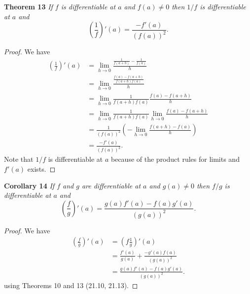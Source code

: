 \documentclass{article}
\begin{document}
\begin{flushleft}
\textbf{Theorem 13}
\textsl{If $f$ is differentiable at $a$ and $f(a) \neq 0$ then $1/f$ is differentiable at $a$ and
\[
\left ( \frac{1}{f} \right )' (a) = \frac{-f'(a)}{(f(a))^2}.
\]}
\begin{proof}
We have
\begin{align*}
\left ( \frac{1}{f} \right )' (a) & = \lim_{h \rightarrow 0} \frac{\frac{1}{f(a+h)} - \frac{1}{f(a)}}{h} \\
	&= \lim_{h \rightarrow 0} \frac{\frac{f(a)-f(a+h)}{f(a+h)f(a)}}{h} \\
	&= \lim_{h \rightarrow 0} \frac{1}{f(a+h)f(a)} \frac{f(a)-f(a+h)}{h} \\
	&= \lim_{h \rightarrow 0} \frac{1}{f(a+h)f(a)} \lim_{h \rightarrow 0} \frac{f(a)-f(a+h)}{h} \\
	&= \frac{1}{(f(a))^2} \left ( -\lim_{h \rightarrow 0} \frac{f(a+h)-f(a)}{h} \right ) \\
	&= \frac{-f'(a)}{(f(a))^2}.
\end{align*}
Note that $1/f$ is differentiable at $a$ because of the product rules for limits and $f'(a)$ exists.
\end{proof}

\textbf{Corollary 14}
\textsl{If $f$ and $g$ are differentiable at $a$ and $g(a) \neq 0$ then $f/g$ is differentiable at $a$ and
\[
\left ( \frac{f}{g} \right )' (a) = \frac{g(a)f'(a) - f(a)g'(a)}{(g(a))^2}.
\]}
\begin{proof}
We have
\begin{align*}
\left ( \frac{f}{g} \right )' (a) &= \left ( f \frac{1}{g} \right )'(a) \\
	&= \frac{f'(a)}{g(a)} + \frac{-g'(a)f(a)}{(g(a))^2} \\
	&=\frac{g(a)f'(a) - f(a)g'(a)}{(g(a))^2}.
\end{align*}
using Theorems 10 and 13 (21.10, 21.13).
\end{proof}


\end{flushleft}
\end{document}
